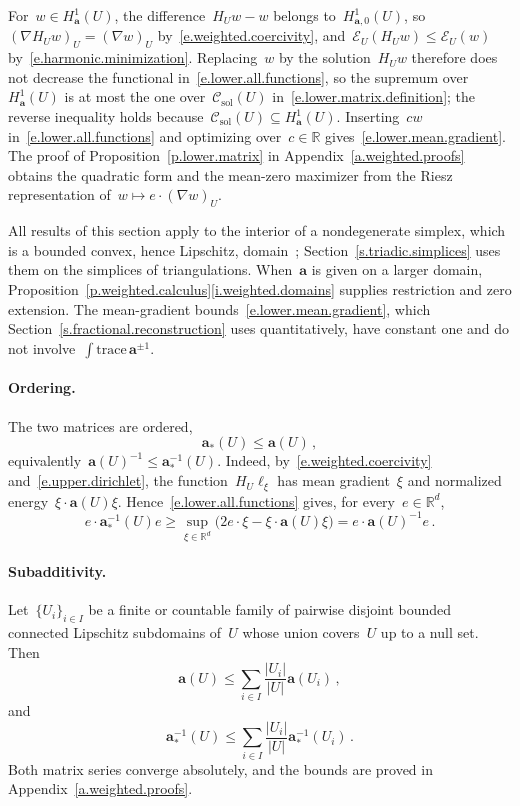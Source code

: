 \documentclass[11pt,letterpaper]{article}
\numberwithin{equation}{section}
\theoremstyle{definition}
\newcommand{\R}{\mathbb{R}}
\newcommand{\Rd}{\mathbb{R}^d}
\renewcommand{\a}{\mathbf{a}}
\newcommand*{\tr}{\mathrm{trace\,}}
\newcommand{\Ener}{\mathcal E}
\newcommand{\Hzero}[1]{H^1_{#1,0}}
\newcommand{\Csol}{\mathcal C_{\mathrm{sol}}}
\begin{document}
For~$w\in H^1_\a(U)$, the difference~$H_Uw-w$ belongs to~$\Hzero{\a}(U)$, so~$(\nabla H_Uw)_U=(\nabla w)_U$ by~\eqref{e.weighted.coercivity}, and~$\Ener_U(H_Uw)\leq\Ener_U(w)$ by~\eqref{e.harmonic.minimization}. Replacing~$w$ by the solution~$H_Uw$ therefore does not decrease the functional in~\eqref{e.lower.all.functions}, so the supremum over~$H^1_\a(U)$ is at most the one over~$\Csol(U)$ in~\eqref{e.lower.matrix.definition}; the reverse inequality holds because~$\Csol(U)\subseteq H^1_\a(U)$. Inserting~$cw$ in~\eqref{e.lower.all.functions} and optimizing over~$c\in\R$ gives~\eqref{e.lower.mean.gradient}. The proof of Proposition~\ref{p.lower.matrix} in Appendix~\ref{a.weighted.proofs} obtains the quadratic form and the mean-zero maximizer from the Riesz representation of~$w\mapsto e\cdot(\nabla w)_U$.

\smallskip

All results of this section apply to the interior of a nondegenerate simplex, which is a bounded convex, hence Lipschitz, domain~\cite[Chapter 3, p.~27]{Guermond.traces}; Section~\ref{s.triadic.simplices} uses them on the simplices of triangulations. When~$\a$ is given on a larger domain, Proposition~\ref{p.weighted.calculus}\ref{i.weighted.domains} supplies restriction and zero extension. The mean-gradient bounds~\eqref{e.lower.mean.gradient}, which Section~\ref{s.fractional.reconstruction} uses quantitatively, have constant one and do not involve~$\int\tr\a^{\pm1}$.

\paragraph{Ordering.} The two matrices are ordered,
\begin{equation}
	\a_*(U)\leq\a(U)\,,
	\label{e.matrix.ordering}
\end{equation}
equivalently~$\a(U)^{-1}\leq\a_*^{-1}(U)$. Indeed, by~\eqref{e.weighted.coercivity} and~\eqref{e.upper.dirichlet}, the function~$H_U\ell_\xi$ has mean gradient~$\xi$ and normalized energy~$\xi\cdot\a(U)\xi$. Hence~\eqref{e.lower.all.functions} gives, for every~$e\in\Rd$,
\begin{equation*}
	e\cdot\a_*^{-1}(U)e
	\geq\sup_{\xi\in\Rd}\bigl(2e\cdot\xi-\xi\cdot\a(U)\xi\bigr)
	=e\cdot\a(U)^{-1}e\,.
\end{equation*}

\paragraph{Subadditivity.} Let~$\{U_i\}_{i\in I}$ be a finite or countable family of pairwise disjoint bounded connected Lipschitz subdomains of~$U$ whose union covers~$U$ up to a null set. Then
\begin{equation}
	\a(U)\leq\sum_{i\in I}\frac{|U_i|}{|U|}\a(U_i)\,,
	\label{e.upper.subadditivity}
\end{equation}
and
\begin{equation}
	\a_*^{-1}(U)\leq\sum_{i\in I}\frac{|U_i|}{|U|}\a_*^{-1}(U_i)\,.
	\label{e.lower.cube.aggregation}
\end{equation}
Both matrix series converge absolutely, and the bounds are proved in Appendix~\ref{a.weighted.proofs}.
\end{document}
